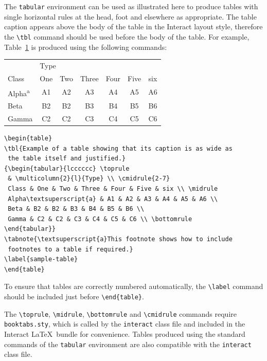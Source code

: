 \documentclass[]{interact}
\theoremstyle{plain}%
\theoremstyle{definition}
\theoremstyle{remark}
\begin{document}
The \texttt{tabular} environment can be used as illustrated here to produce tables with single horizontal rules at the head, foot and elsewhere as appropriate.
The table caption appears above the body of the table in the \textsf{Interact} layout style, therefore the \verb"\tbl" command should be used before the body of the table.
For example, Table~\ref{sample-table} is produced using the following commands:
\begin{table}
{\begin{tabular}{lcccccc} \toprule
 & \multicolumn{2}{l}{Type} \\ \cmidrule{2-7}
 Class & One & Two & Three & Four & Five & six \\ \midrule
 Alpha\textsuperscript{a} & A1 & A2 & A3 & A4 & A5 & A6 \\
 Beta & B2 & B2 & B3 & B4 & B5 & B6 \\
 Gamma & C2 & C2 & C3 & C4 & C5 & C6 \\ \bottomrule
\end{tabular}}
\label{sample-table}
\end{table}
\begin{verbatim}
\begin{table}
\tbl{Example of a table showing that its caption is as wide as
 the table itself and justified.}
{\begin{tabular}{lcccccc} \toprule
 & \multicolumn{2}{l}{Type} \\ \cmidrule{2-7}
 Class & One & Two & Three & Four & Five & six \\ \midrule
 Alpha\textsuperscript{a} & A1 & A2 & A3 & A4 & A5 & A6 \\
 Beta & B2 & B2 & B3 & B4 & B5 & B6 \\
 Gamma & C2 & C2 & C3 & C4 & C5 & C6 \\ \bottomrule
\end{tabular}}
\tabnote{\textsuperscript{a}This footnote shows how to include
 footnotes to a table if required.}
\label{sample-table}
\end{table}
\end{verbatim}

To ensure that tables are correctly numbered automatically, the \verb"\label" command should be included just before \verb"\end{table}".

The \verb"\toprule", \verb"\midrule", \verb"\bottomrule" and \verb"\cmidrule" commands require \verb"booktabs.sty", which is called by the \texttt{interact} class file and included in the \textsf{Interact} \LaTeX\ bundle for convenience. Tables produced using the standard commands of the \texttt{tabular} environment are also compatible with the \texttt{interact} class file.
\end{document}
